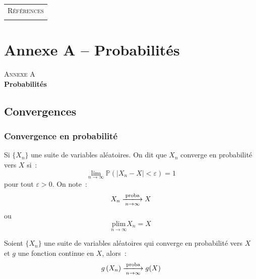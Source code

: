 \documentclass[10pt]{beamer}
\begin{document}
\begin{notes}

  \begin{center}
    \begin{tabular}{c}
      \\
      \Huge{\textsc{Références}}\\
      \\
    \end{tabular}
  \end{center}

  \bigskip

  \nocite{Greene2017}

  \nocite{Schmidt1976}

  \printbibliography

\end{notes}



\appendix
\section{Annexe A -- Probabilités}

\begin{frame}
  \begin{center}
    \Huge{\textsc{Annexe A}}\\
    \Huge\textbf{Probabilités}
  \end{center}
\end{frame}

\subsection{Convergences}

\begin{frame}
  \frametitle{Convergence en probabilité}

  \begin{defn}{}
    Si $\{X_n\}$ une suite de variables aléatoires. On dit que $X_n$ converge en probabilité vers $X$ si~:
    \[
      \underset{n\rightarrow\infty}{\lim} \mathbb P\left( |X_n-X|<\varepsilon \right) = 1
    \]
    pour tout $\varepsilon>0$. On note~:
    \[
      X_n \xlongrightarrow[n\rightarrow\infty]{\text{proba}} X
    \]
    ou
    \[
      \underset{n\rightarrow\infty}{\text{plim}} X_n = X
    \]
  \end{defn}

  \bigskip

  \begin{theorem}\label{thm:Slutsky} Soient $\{X_n\}$ une suite de variables
    aléatoires qui converge en probabilité vers $X$ et $g$ une
    fonction continue en $X$, alors~:
    \[
      g\left( X_n \right)\xlongrightarrow[n\rightarrow\infty]{\text{proba}} g(X)
    \]
  \end{theorem}

\end{frame}
\end{document}
